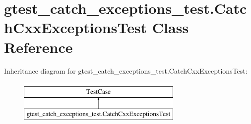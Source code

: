 \hypertarget{classgtest__catch__exceptions__test_1_1_catch_cxx_exceptions_test}{\section{gtest\-\_\-catch\-\_\-exceptions\-\_\-test.\-Catch\-Cxx\-Exceptions\-Test Class Reference}
\label{classgtest__catch__exceptions__test_1_1_catch_cxx_exceptions_test}
}
Inheritance diagram for gtest\-\_\-catch\-\_\-exceptions\-\_\-test.\-Catch\-Cxx\-Exceptions\-Test\-:\begin{figure}[H]
\begin{center}
\leavevmode
\includegraphics[height=2.000000cm]{classgtest__catch__exceptions__test_1_1_catch_cxx_exceptions_test}
\end{center}
\end{figure}
